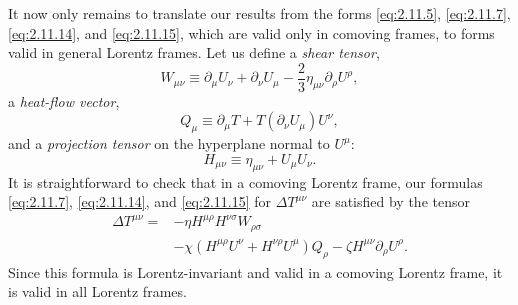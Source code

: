 It now only remains to translate our results from the forms
\eqref{eq:2.11.5}, \eqref{eq:2.11.7}, \eqref{eq:2.11.14}, and
\eqref{eq:2.11.15}, which are valid only in comoving frames, to forms valid
in general Lorentz frames. Let us define a \emph{shear tensor},
\begin{equation}
  W_{\mu\nu}\equiv
  \partial_\mu U_\nu+\partial_\nu U_\mu
  -\frac23\eta_{\mu\nu}\partial_\rho U^\rho ,
  \tag{2.11.18}\label{eq:2.11.18}
\end{equation}
a \emph{heat-flow vector},
\begin{equation}
  Q_\mu\equiv\partial_\mu T
  +T(\partial_\nu U_\mu)U^\nu ,
  \tag{2.11.19}\label{eq:2.11.19}
\end{equation}
and a \emph{projection tensor} on the hyperplane normal to \(U^\mu\):
\begin{equation}
  H_{\mu\nu}\equiv\eta_{\mu\nu}+U_\mu U_\nu .
  \tag{2.11.20}\label{eq:2.11.20}
\end{equation}
It is straightforward to check that in a comoving Lorentz frame, our formulas
\eqref{eq:2.11.7}, \eqref{eq:2.11.14}, and \eqref{eq:2.11.15} for
\(\Delta T^{\mu\nu}\) are satisfied by the tensor
\begin{equation}
\begin{aligned}
  \Delta T^{\mu\nu}={}&
  -\eta H^{\mu\rho}H^{\nu\sigma}W_{\rho\sigma}\\
  &-\chi\left(H^{\mu\rho}U^\nu+H^{\nu\rho}U^\mu\right)Q_\rho
  -\zeta H^{\mu\nu}\partial_\rho U^\rho .
\end{aligned}
  \tag{2.11.21}\label{eq:2.11.21}
\end{equation}
Since this formula is Lorentz-invariant and valid in a comoving Lorentz frame,
it is valid in all Lorentz frames.

